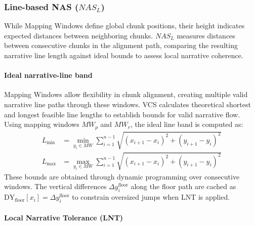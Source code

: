 \documentclass[main.tex]{subfiles}
\begin{document}
\subsubsection{Line-based NAS ($NAS_L$)}
While Mapping Windows define global chunk positions, their height indicates expected distances between neighboring chunks. $NAS_L$ measures distances between consecutive chunks in the alignment path, comparing the resulting narrative line length against ideal bounds to assess local narrative coherence.

\paragraph{Ideal narrative-line band}
Mapping Windows allow flexibility in chunk alignment, creating multiple valid narrative line paths through these windows. VCS calculates theoretical shortest and longest feasible line lengths to establish bounds for valid narrative flow. Using mapping windows $MW_p$ and $MW_r$, the ideal line band is computed as:
\begin{align}
L_{\min} &= \min_{y_i \in MW} \sum_{i=1}^{n-1} \sqrt{(x_{i+1} - x_i)^2 + (y_{i+1} - y_i)^2} \\
L_{\max} &= \max_{y_i \in MW} \sum_{i=1}^{n-1} \sqrt{(x_{i+1} - x_i)^2 + (y_{i+1} - y_i)^2}
\end{align}
These bounds are obtained through dynamic programming over consecutive windows. The vertical differences $\Delta y_i^{\text{floor}}$ along the floor path are cached as $\text{DY}_{\text{floor}}[x_i] = \Delta y_i^{\text{floor}}$ to constrain oversized jumps when LNT is applied.

\paragraph{Local Narrative Tolerance (LNT)}
\end{document}
